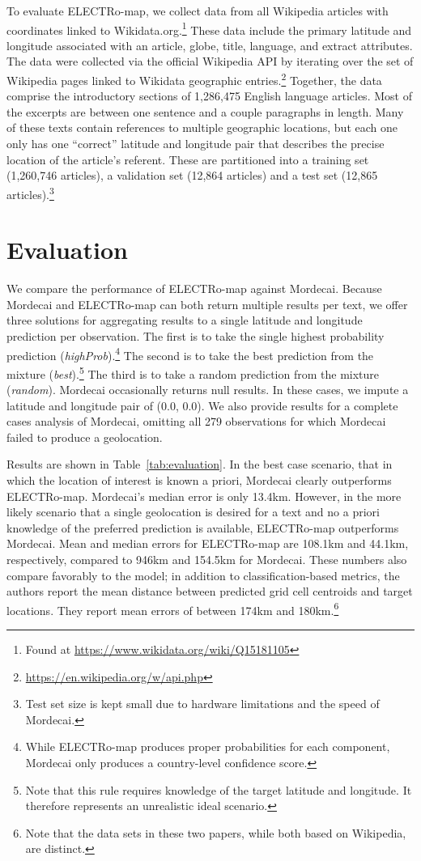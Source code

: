 \documentclass[11pt,a4paper]{article}
\begin{document}
To evaluate ELECTRo-map, we collect data from all Wikipedia articles with coordinates linked to Wikidata.org.\footnote{Found at \url{https://www.wikidata.org/wiki/Q15181105}} These data include the primary latitude and longitude associated with an article, globe, title, language, and extract attributes. The data were collected via the official Wikipedia API by iterating over the set of Wikipedia pages linked to Wikidata geographic entries.\footnote{\url{https://en.wikipedia.org/w/api.php}}  Together, the data comprise the introductory sections of 1,286,475 English language articles. Most of the excerpts are between one sentence and a couple paragraphs in length. Many of these texts contain references to multiple geographic locations, but each one only has one ``correct'' latitude and longitude pair that describes the precise location of the article's referent. These are partitioned into a training set (1,260,746 articles), a validation set (12,864 articles) and a test set (12,865 articles).\footnote{Test set size is kept small due to hardware limitations and the speed of Mordecai.}

\section{Evaluation}

We compare the performance of ELECTRo-map against Mordecai. Because Mordecai and ELECTRo-map can both return multiple results per text, we offer three solutions for aggregating results to a single latitude and longitude prediction per observation. The first is to take the single highest probability prediction (\textit{highProb}).\footnote{While ELECTRo-map produces proper probabilities for each component, Mordecai only produces a country-level confidence score.} The second is to take the best prediction from the mixture (\textit{best}).\footnote{Note that this rule requires knowledge of the target latitude and longitude. It therefore represents an unrealistic ideal scenario.} The third is to take a random prediction from the mixture (\textit{random}). Mordecai occasionally returns null results. In these cases, we impute a latitude and longitude pair of (0.0, 0.0). We also provide results for a complete cases analysis of Mordecai, omitting all 279 observations for which Mordecai failed to produce a geolocation.

Results are shown in Table~\ref{tab:evaluation}. In the best case scenario, that in which the location of interest is known a priori, Mordecai clearly outperforms ELECTRo-map. Mordecai's median error is only 13.4km. However, in the more likely scenario that a single geolocation is desired for a text and no a priori knowledge of the preferred prediction is available, ELECTRo-map outperforms Mordecai. Mean and median errors for ELECTRo-map are 108.1km and 44.1km, respectively, compared to 946km and 154.5km for Mordecai. These numbers also compare favorably to the \citet{kulkarni:etal:2020} model; in addition to classification-based metrics, the authors report the mean distance between predicted grid cell centroids and target locations. They report mean errors of between 174km and 180km.\footnote{Note that the data sets in these two papers, while both based on Wikipedia, are distinct.}
\end{document}
